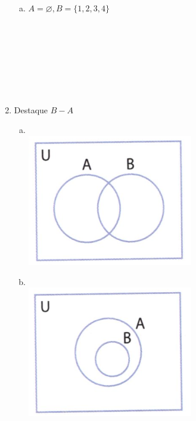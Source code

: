 \documentclass[a4paper,14pt]{article}
\begin{document}
\begin{multicols}{2}
\begin{enumerate}
\begin{enumerate}[a)]
   				\item $A = \varnothing, B = \{1, 2, 3, 4\}$ \\\\\\\\\\\\\\\\
   			\end{enumerate}
   			\item Destaque $B - A$
   			\begin{enumerate}[a)]
   				\item ~ \\ \includegraphics[width=1\linewidth]{6FMA73_imagens/imagem01}
   				\item ~ \\
   				\includegraphics[width=1\linewidth]{6FMA73_imagens/imagem02} \newpage

\end{enumerate}
\end{enumerate}
\end{multicols}
\end{document}
